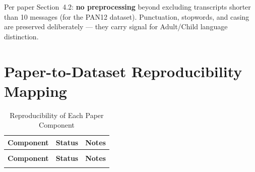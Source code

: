 \documentclass[12pt,a4paper]{article}
\begin{document}
Per paper Section~4.2: \textbf{no preprocessing} beyond excluding
transcripts shorter than 10 messages (for the PAN12 dataset). Punctuation,
stopwords, and casing are preserved deliberately --- they carry signal for
Adult/Child language distinction.

\section{Paper-to-Dataset Reproducibility Mapping}

\begin{longtable}{>{\raggedright\arraybackslash}p{4.2cm}
                  >{\centering\arraybackslash}p{2.1cm}
                  >{\raggedright\arraybackslash}p{7.5cm}}
  \caption{Reproducibility of Each Paper Component}
  \label{tab:reproducibility} \\
  \toprule
  \textbf{Component} & \textbf{Status} & \textbf{Notes} \\
  \midrule
  \endfirsthead
  \multicolumn{3}{c}{\tablename~\thetable\ (continued)} \\
  \toprule
  \textbf{Component} & \textbf{Status} & \textbf{Notes} \\
  \midrule
  \endhead
  \bottomrule
  \endfoot


\end{longtable}
\end{document}
